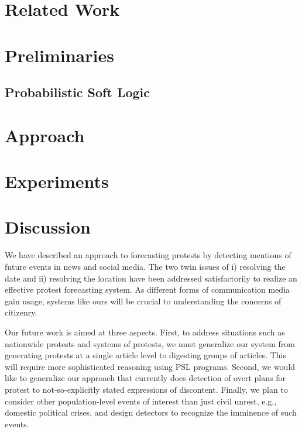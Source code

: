 \documentclass[10pt]{report}
\begin{document}
%
\chapter{Related Work}


\chapter{Preliminaries}


\section{Probabilistic Soft Logic}

\label{section:PSL}

\chapter{Approach}


\chapter{Experiments}


\chapter{Discussion}
We have described an approach to forecasting protests by detecting mentions of future events in news and social
media. The two twin issues of i) resolving the date and ii) resolving the location have been addressed satisfactorily
to realize an effective protest forecasting system. As different forms of communication media gain usage, systems
like ours will be crucial to understanding the concerns of citizenry.

Our future work is aimed at three aspects. First, to address situations such as nationwide protests and systems of protests,
we must generalize our system from generating protests at a single article level to digesting groups of articles. This will
require more sophisticated reasoning using PSL programs. 
Second, we would like to generalize our approach that currently
does detection of overt plans for protest to not-so-explicitly stated expressions of discontent. 
Finally, we plan to consider other population-level events of interest than just civil unrest, e.g., domestic political crises,
and design detectors to recognize the imminence of such events.




\cleardoublepage
{}


\end{document}
